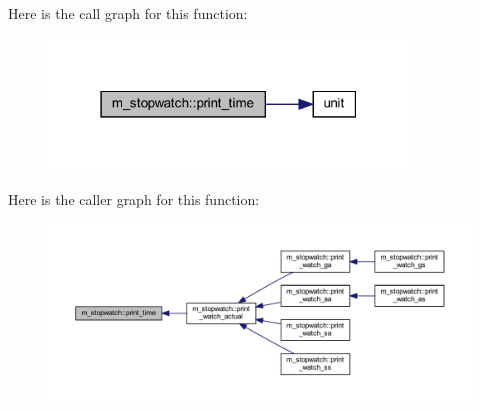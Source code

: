 Here is the call graph for this function\+:
\nopagebreak
\begin{figure}[H]
\begin{center}
\leavevmode
\includegraphics[width=271pt]{namespacem__stopwatch_a53db4833863b567afa71540bd9aad8f5_cgraph}
\end{center}
\end{figure}
Here is the caller graph for this function\+:
\nopagebreak
\begin{figure}[H]
\begin{center}
\leavevmode
\includegraphics[width=350pt]{namespacem__stopwatch_a53db4833863b567afa71540bd9aad8f5_icgraph}
\end{center}
\end{figure}
\mbox{\label{namespacem__stopwatch_a1069de62b768281802b7d9528929f216}} 
